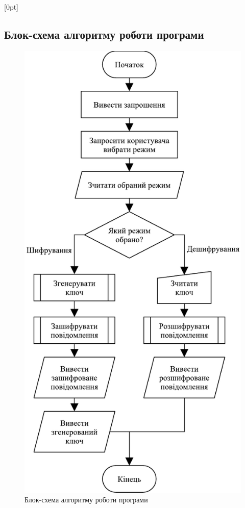 \documentclass[a4paper,oneside,titlepage,14pt]{extarticle}
\begin{document}
[0pt]
  {\normalsize\bfseries}
  {}
  {}
  {\hfill\contentspage} %
	\begin{appendices}
		\section{Блок-схема алгоритму роботи програми}
			\vspace*{\fill}
			\begin{figure}[h]
				\centering
				\includegraphics[scale=0.755]{diagrams/program-algorithm-flowchart.pdf}
				\caption{Блок-схема алгоритму роботи програми}
				\label{fig:programflowchart}
			\end{figure}
			\vspace*{\fill}
			\newpage

\end{appendices}
\end{document}
